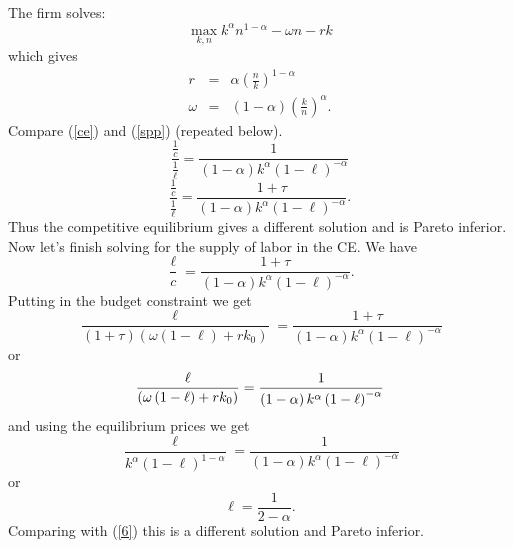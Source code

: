 \documentclass{sebase}
\begin{document}
The firm solves:%
\begin{equation*}
\underset{k,n}{\max }k^{\alpha }n^{1-\alpha }-\omega n-rk
\end{equation*}%
which gives 
\begin{eqnarray*}
r &=&\alpha \left( \frac{n}{k}\right) ^{1-\alpha } \\
\omega &=&\left( 1-\alpha \right) \left( \frac{k}{n}\right) ^{\alpha }.
\end{eqnarray*}%
Compare (\ref{ce}) and (\ref{spp}) (repeated below).%
\begin{equation*}
\frac{\frac{1}{c}}{\frac{1}{\ell }}=\frac{1}{\left( 1-\alpha \right)
k^{\alpha }\left( 1-\ell \right) ^{-\alpha }}
\end{equation*}%
\begin{equation}
\frac{\frac{1}{c}}{\frac{1}{\ell }}=\frac{1+\tau }{\left( 1-\alpha \right)
k^{\alpha }\left( 1-\ell \right) ^{-\alpha }}.  \label{ce}
\end{equation}%
Thus the competitive equilibrium gives a different solution and is Pareto
inferior. \pagebreak \newline
Now let's finish solving for the supply of labor in the CE. We have 
\begin{equation*}
\frac{\ell }{c}=\frac{1+\tau }{\left( 1-\alpha \right) k^{\alpha }\left(
1-\ell \right) ^{-\alpha }}.
\end{equation*}%
Putting in the budget constraint we get%
\begin{equation*}
\frac{\ell }{\left( 1+\tau \right) \left( \omega \left( 1-\ell \right)
+rk_{0}\right) }=\frac{1+\tau }{\left( 1-\alpha \right) k^{\alpha }\left(
1-\ell \right) ^{-\alpha }}
\end{equation*}%
or%
\begin{equation*}
\frac{\ell }{\left( \omega \left( 1-\ell \right) +rk_{0}\right) }=\frac{1}{%
\left( 1-\alpha \right) k^{\alpha }\left( 1-\ell \right) ^{-\alpha }}
\end{equation*}%
and using the equilibrium prices we get%
\begin{equation*}
\frac{\ell }{k^{\alpha }\left( 1-\ell \right) ^{1-\alpha }}=\frac{1}{\left(
1-\alpha \right) k^{\alpha }\left( 1-\ell \right) ^{-\alpha }}
\end{equation*}%
or%
\begin{equation}
\ell =\frac{1}{2-\alpha }.  \label{9}
\end{equation}%
\newline
Comparing with (\ref{6}) this is a different solution and Pareto
inferior.\pagebreak
\end{document}
